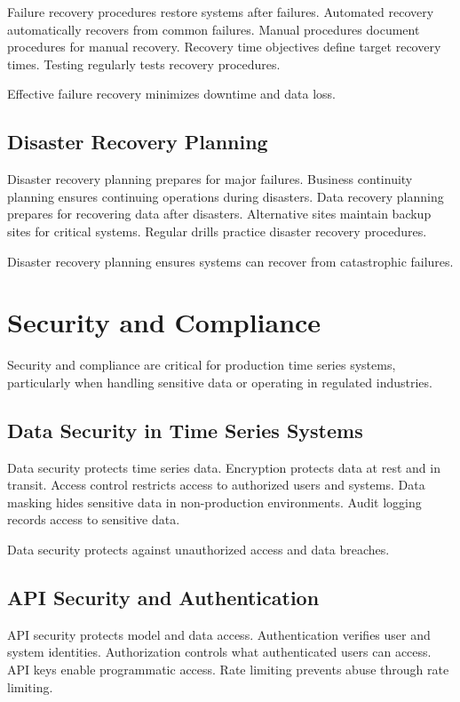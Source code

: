 Failure recovery procedures restore systems after failures. Automated recovery automatically recovers from common failures. Manual procedures document procedures for manual recovery. Recovery time objectives define target recovery times. Testing regularly tests recovery procedures.

Effective failure recovery minimizes downtime and data loss.

\subsection{Disaster Recovery Planning}

Disaster recovery planning prepares for major failures. Business continuity planning ensures continuing operations during disasters. Data recovery planning prepares for recovering data after disasters. Alternative sites maintain backup sites for critical systems. Regular drills practice disaster recovery procedures.

Disaster recovery planning ensures systems can recover from catastrophic failures.

\section{Security and Compliance}

Security and compliance are critical for production time series systems, particularly when handling sensitive data or operating in regulated industries.

\subsection{Data Security in Time Series Systems}

Data security protects time series data. Encryption protects data at rest and in transit. Access control restricts access to authorized users and systems. Data masking hides sensitive data in non-production environments. Audit logging records access to sensitive data.

Data security protects against unauthorized access and data breaches.

\subsection{API Security and Authentication}

API security protects model and data access. Authentication verifies user and system identities. Authorization controls what authenticated users can access. API keys enable programmatic access. Rate limiting prevents abuse through rate limiting.

